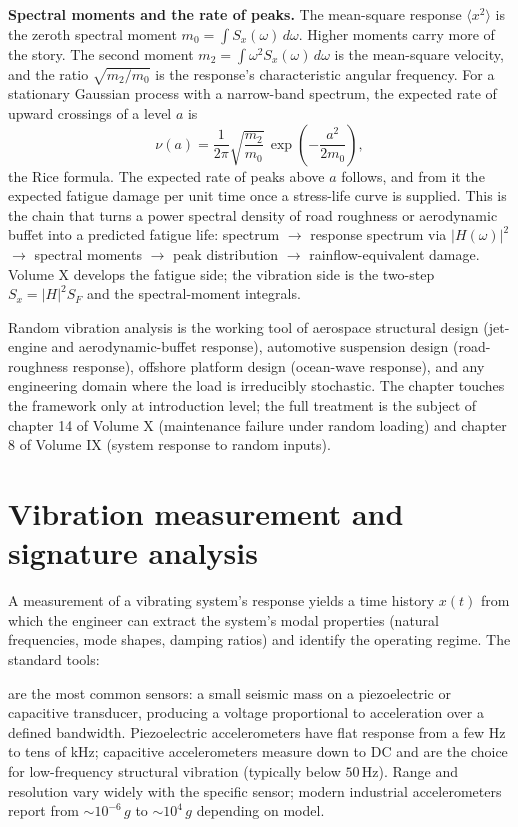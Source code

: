 \begin{mastery}
\textbf{Spectral moments and the rate of peaks.} The mean-square
response $\langle x^2 \rangle$ is the zeroth spectral moment $m_0 =
\int S_x(\omega)\,d\omega$. Higher moments carry more of the story.
The second moment $m_2 = \int \omega^2 S_x(\omega)\,d\omega$ is the
mean-square velocity, and the ratio $\sqrt{m_2/m_0}$ is the response's
characteristic angular frequency. For a stationary Gaussian process
with a narrow-band spectrum, the expected rate of upward crossings of
a level $a$ is
\[
\nu(a) = \frac{1}{2\pi}\sqrt{\frac{m_2}{m_0}}\,
\exp\!\left(-\frac{a^2}{2 m_0}\right),
\]
the Rice formula. The expected rate of peaks above $a$ follows, and
from it the expected fatigue damage per unit time once a stress-life
curve is supplied. This is the chain that turns a power spectral
density of road roughness or aerodynamic buffet into a predicted
fatigue life: spectrum $\to$ response spectrum via $|H(\omega)|^2$
$\to$ spectral moments $\to$ peak distribution $\to$ rainflow-equivalent
damage. Volume X develops the fatigue side; the vibration side is the
two-step $S_x = |H|^2 S_F$ and the spectral-moment integrals.
\end{mastery}

Random vibration analysis is the working tool of aerospace structural
design (jet-engine and aerodynamic-buffet response), automotive
suspension design (road-roughness response), offshore platform
design (ocean-wave response), and any engineering domain where the
load is irreducibly stochastic. The chapter touches the framework
only at introduction level; the full treatment is the subject of
chapter 14 of Volume X (maintenance failure under random loading)
and chapter 8 of Volume IX (system response to random inputs).

\section{Vibration measurement and signature analysis}

A measurement of a vibrating system's response yields a time history
$x(t)$ from which the engineer can extract the system's modal
properties (natural frequencies, mode shapes, damping ratios) and
identify the operating regime. The standard tools:

 are the most common sensors: a small
seismic mass on a piezoelectric or capacitive transducer, producing
a voltage proportional to acceleration over a defined bandwidth.
Piezoelectric accelerometers have flat response from a few Hz to
tens of kHz; capacitive accelerometers measure down to DC and are
the choice for low-frequency structural vibration (typically below
$50\,\si{\hertz}$). Range and resolution vary widely with the
specific sensor; modern industrial accelerometers report from
$\sim 10^{-6}\,g$ to $\sim 10^4\,g$ depending on model.

